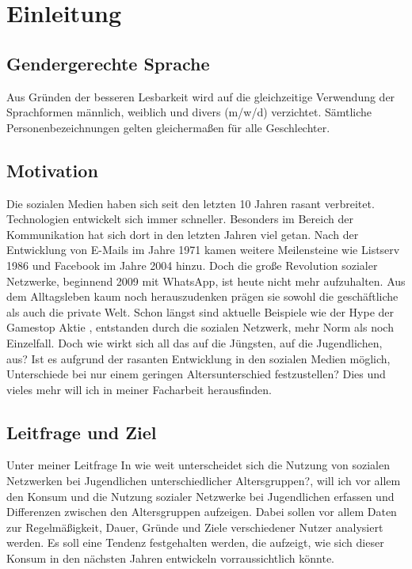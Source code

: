 \section{Einleitung}

\subsection{Gendergerechte Sprache}

Aus Gründen der besseren Lesbarkeit wird auf die gleichzeitige Verwendung der Sprachformen männlich, weiblich und divers (m/w/d) 
verzichtet. Sämtliche Personenbezeichnungen gelten gleichermaßen für alle Geschlechter. 

\subsection{Motivation}

Die sozialen Medien haben sich seit den letzten 10 Jahren rasant verbreitet. Technologien entwickelt sich immer schneller. Besonders im Bereich der Kommunikation
hat sich dort in den letzten Jahren viel getan. Nach der Entwicklung von E-Mails im Jahre 1971
\footnotemark{} kamen weitere Meilensteine wie Listserv 1986 und Facebook im Jahre 2004 hinzu. \newline
Doch die große Revolution sozialer Netzwerke, beginnend 2009 mit WhatsApp, ist heute nicht mehr aufzuhalten. Aus dem Alltagsleben kaum noch 
herauszudenken prägen sie sowohl die 
geschäftliche als auch die private Welt. Schon längst sind aktuelle Beispiele wie der Hype der Gamestop Aktie \footnotemark{}, entstanden durch die 
sozialen Netzwerk,  mehr Norm als noch Einzelfall. Doch wie wirkt sich all das auf die Jüngsten, auf die Jugendlichen, aus? 
Ist es aufgrund der rasanten Entwicklung in den sozialen Medien möglich, Unterschiede bei nur einem geringen 
Altersunterschied festzustellen? Dies und vieles mehr will ich in meiner Facharbeit herausfinden.

\subsection{Leitfrage und Ziel}

Unter meiner Leitfrage \glqq In wie weit unterscheidet sich die Nutzung von sozialen Netzwerken bei Jugendlichen unterschiedlicher
Altersgruppen?\grqq, will ich vor allem den Konsum und die Nutzung sozialer Netzwerke bei Jugendlichen erfassen 
und Differenzen zwischen den Altersgruppen aufzeigen. Dabei sollen vor allem Daten zur Regelmäßigkeit, Dauer, Gründe und Ziele 
verschiedener Nutzer analysiert werden. Es soll eine Tendenz festgehalten werden, die aufzeigt, wie sich dieser Konsum in den
nächsten Jahren entwickeln vorraussichtlich könnte.